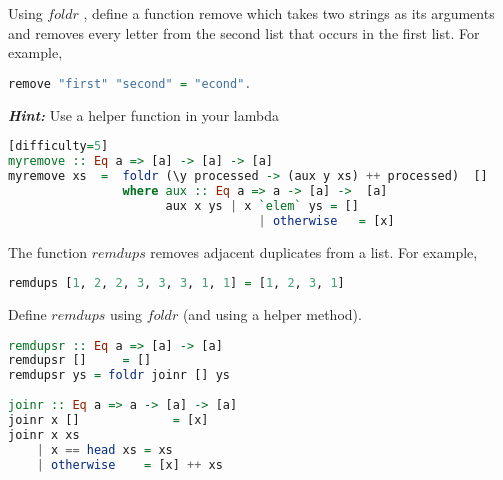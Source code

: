 \documentclass{article}
\begin{document}
\begin{Exercise} [difficulty=4]
Using $foldr$ , define a function remove which takes two strings as its arguments
and removes every letter from the second list that occurs in the first list. For
example, 
\begin{lstlisting}[language=Haskell]
remove "first" "second" = "econd".
\end{lstlisting}
\textbf{\textit{Hint:}} Use a helper function in your lambda 
\end{Exercise} 
\begin{Answer}
\begin{lstlisting}[language=Haskell][difficulty=5]
myremove :: Eq a => [a] -> [a] -> [a]
myremove xs  =  foldr (\y processed -> (aux y xs) ++ processed)  [] 
                where aux :: Eq a => a -> [a] ->  [a]
                      aux x ys | x `elem` ys = []
                                   | otherwise   = [x]
\end{lstlisting}
\end{Answer}


\begin{Exercise} [difficulty=5]
The function $remdups$ removes adjacent duplicates from a list. For example,
\begin{lstlisting}[language=Haskell]
remdups [1, 2, 2, 3, 3, 3, 1, 1] = [1, 2, 3, 1]
\end{lstlisting}

Define $remdups$ using $foldr$ (and using a helper method). 
\end{Exercise} 

\begin{Answer}
\begin{lstlisting}[language=Haskell]
remdupsr :: Eq a => [a] -> [a]
remdupsr []     = []
remdupsr ys = foldr joinr [] ys
        
joinr :: Eq a => a -> [a] -> [a]
joinr x []             = [x]
joinr x xs
    | x == head xs = xs
    | otherwise    = [x] ++ xs        
\end{lstlisting}
\end{Answer}
%
\newpage
\end{document}
